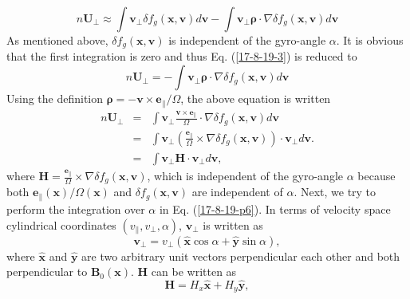\documentclass{llncs}
\newcommand{\tmmathbf}[1]{\ensuremath{\boldsymbol{#1}}}
\begin{document}
\begin{equation}
  \label{17-8-19-3} n\mathbf{U}_{\perp} \approx \int \mathbf{v}_{\perp} \delta
  f_g (\mathbf{x}, \mathbf{v}) d\mathbf{v}- \int \mathbf{v}_{\perp}
  \tmmathbf{\rho} \cdot \nabla \delta f_g (\mathbf{x}, \mathbf{v}) d\mathbf{v}
\end{equation}
As mentioned above, $\delta f_g (\mathbf{x}, \mathbf{v})$ is independent of
the gyro-angle $\alpha$. It is obvious that the first integration is zero and
thus Eq. (\ref{17-8-19-3}) is reduced to
\begin{equation}
  n\mathbf{U}_{\perp} = - \int \mathbf{v}_{\perp} \tmmathbf{\rho} \cdot \nabla
  \delta f_g (\mathbf{x}, \mathbf{v}) d\mathbf{v}
\end{equation}
Using the definition $\tmmathbf{\rho}= -\mathbf{v} \times
\mathbf{e}_{\parallel} / \Omega$, the above equation is written
\begin{eqnarray}
  n\mathbf{U}_{\perp} & = & \int \mathbf{v}_{\perp} \frac{\mathbf{v} \times
  \mathbf{e}_{\parallel}}{\Omega} \cdot \nabla \delta f_g (\mathbf{x},
  \mathbf{v}) d\mathbf{v} \nonumber\\
  & = & \int \mathbf{v}_{\perp} \left( \frac{\mathbf{e}_{\parallel}}{\Omega}
  \times \nabla \delta f_g (\mathbf{x}, \mathbf{v}) \right) \cdot
  \mathbf{v}_{\perp} d\mathbf{v}. \nonumber\\
  & = & \int \mathbf{v}_{\perp} \mathbf{H} \cdot \mathbf{v}_{\perp}
  d\mathbf{v},  \label{17-8-19-p6}
\end{eqnarray}
where $\mathbf{H}= \frac{\mathbf{e}_{\parallel}}{\Omega} \times \nabla \delta
f_g (\mathbf{x}, \mathbf{v})$, which is independent of the gyro-angle $\alpha$
because both $\mathbf{e}_{\parallel} (\mathbf{x}) / \Omega (\mathbf{x})$ and
$\delta f_g (\mathbf{x}, \mathbf{v})$ are independent of $\alpha$. Next, we
try to perform the integration over $\alpha$ in Eq. (\ref{17-8-19-p6}). In
terms of velocity space cylindrical coordinates $(v_{\parallel}, v_{\perp},
\alpha)$, $\mathbf{v}_{\perp}$ is written as
\begin{equation}
  \mathbf{v}_{\perp} = v_{\perp} (\hat{\mathbf{x}} \cos \alpha +
  \hat{\mathbf{y}} \sin \alpha),
\end{equation}
where $\hat{\mathbf{x}}$ and $\hat{\mathbf{y}}$ are two arbitrary unit vectors
perpendicular each other and both perpendicular to $\mathbf{B}_0
(\mathbf{x})$. $\mathbf{H}$ can be written as
\begin{equation}
  \mathbf{H}= H_x \hat{\mathbf{x}} + H_y \hat{\mathbf{y}},
\end{equation}
\end{document}
